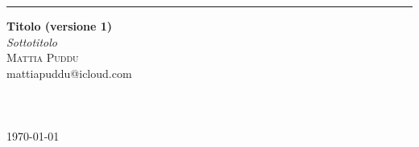 \begin{titlepage}
    \raggedleft	
    \rule{1pt}{.125\textheight}
	\hspace{0.025\textwidth}
	\parbox[b]{.85\textwidth}{
		{\HUGE\bfseries Titolo (versione 1)
        }\\[2\baselineskip]
		{\Large\textit{Sottotitolo}}\\[45.5\baselineskip]
        {\Large\textsc{Mattia Puddu}\\[.35\baselineskip] mattiapuddu@icloud.com} \\\\\\\\
        {\Large\today}

 }
\end{titlepage}
